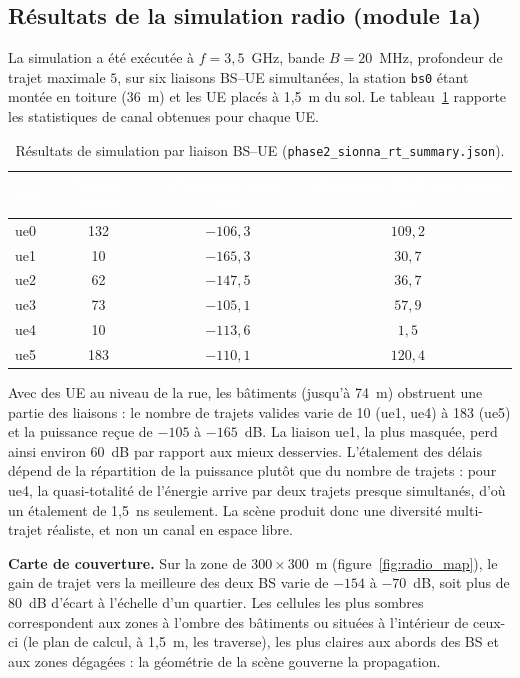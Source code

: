\documentclass[12pt,a4paper,titlepage]{article}
\newcommand{\hd}[1]{\textcolor{white}{\textbf{#1}}}
\begin{document}
\subsection{Résultats de la simulation radio (module 1a)}
\label{subsec:res_phase2}

La simulation a été exécutée à $f = 3{,}5$~GHz, bande $B = 20$~MHz, profondeur de trajet maximale $5$, sur six liaisons BS--UE simultanées, la station \texttt{bs0} étant montée en toiture (36~m) et les UE placés à 1,5~m du sol. Le tableau~\ref{tab:res_phase2} rapporte les statistiques de canal obtenues pour chaque UE.

\begin{table}[H]
    \centering
    \caption{Résultats de simulation par liaison BS--UE (\texttt{phase2\_sionna\_rt\_summary.json}).}
    \label{tab:res_phase2}
    \begin{tabular}{lccc}
        \toprule
        \rowcolor{tabhead}
        \hd{UE} & \hd{Trajets valides} & \hd{Puissance totale (dB)} & \hd{Étalement RMS des délais (ns)} \\
        \midrule
        ue0 & 132 & $-106{,}3$ & $109{,}2$ \\
        ue1 & 10  & $-165{,}3$ & $30{,}7$ \\
        ue2 & 62  & $-147{,}5$ & $36{,}7$ \\
        ue3 & 73  & $-105{,}1$ & $57{,}9$ \\
        ue4 & 10  & $-113{,}6$ & $1{,}5$ \\
        ue5 & 183 & $-110{,}1$ & $120{,}4$ \\
        \bottomrule
    \end{tabular}
\end{table}

Avec des UE au niveau de la rue, les bâtiments (jusqu'à 74~m) obstruent une partie des liaisons : le nombre de trajets valides varie de 10 (ue1, ue4) à 183 (ue5) et la puissance reçue de $-105$ à $-165$~dB. La liaison ue1, la plus masquée, perd ainsi environ 60~dB par rapport aux mieux desservies. L'étalement des délais dépend de la répartition de la puissance plutôt que du nombre de trajets : pour ue4, la quasi-totalité de l'énergie arrive par deux trajets presque simultanés, d'où un étalement de 1,5~ns seulement. La scène produit donc une diversité multi-trajet réaliste, et non un canal en espace libre.

\textbf{Carte de couverture.} Sur la zone de $300\times300$~m (figure~\ref{fig:radio_map}), le gain de trajet vers la meilleure des deux BS varie de $-154$ à $-70$~dB, soit plus de 80~dB d'écart à l'échelle d'un quartier. Les cellules les plus sombres correspondent aux zones à l'ombre des bâtiments ou situées à l'intérieur de ceux-ci (le plan de calcul, à 1,5~m, les traverse), les plus claires aux abords des BS et aux zones dégagées : la géométrie de la scène gouverne la propagation.
\end{document}
